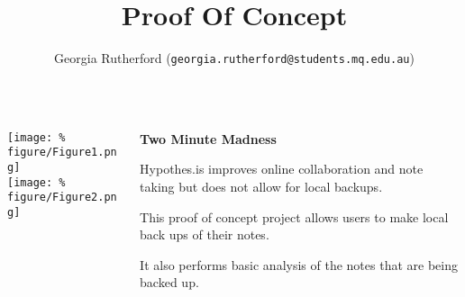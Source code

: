\documentclass[unknownkeysallowed,usepdftitle=false, parskip=full]{beamer}
\title{Proof Of Concept}
\author{Georgia Rutherford (\texttt{georgia.rutherford@students.mq.edu.au})}
\institute{Macquarie University}
\newcommand{\secvariable}{nothing}
\newcommand{\mysection}[1]{\renewcommand{\secvariable}{#1}
}
\begin{document}
\mysection{abstract}
\begin{frame}\label{\secvariable}

  \begin{columns}[t]
  \begin{column}[c]{0.44\textwidth}
\texttt{[image: \%
figure/Figure1.png]}\\
\vspace{12pt}
\texttt{[image: \%
figure/Figure2.png]}
    \end{column}
    \begin{column}[c]{0.45\textwidth}
    \parbox{\linewidth}{
\textbf{Two Minute Madness}
  \vspace{12pt}
  
     Hypothes.is improves online collaboration and note taking but does not allow for local backups. 
     
     \vspace{12pt}
     This proof of concept project allows users to make local back ups of their notes. 
     
     \vspace{12pt}
     
     It also performs basic analysis of the notes that are being backed up.
      
      
      
      
      }
 \end{column}
 \end{columns}   

   
\end{frame}
\end{document}
